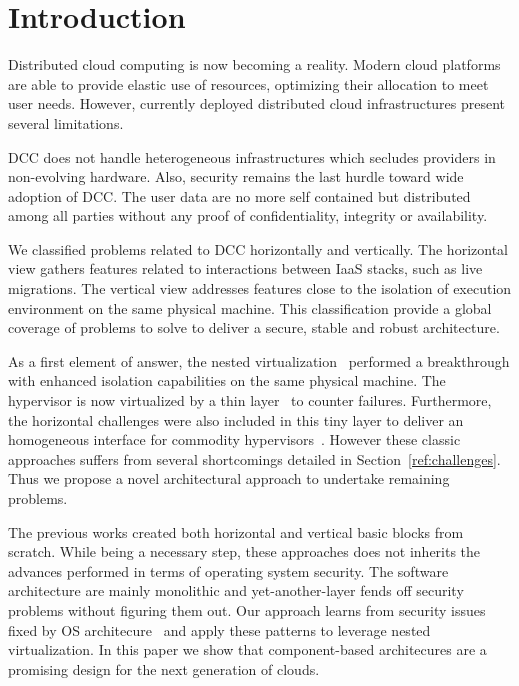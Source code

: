 \documentclass{sig-alternate}
\begin{document}
\section{Introduction}
\label{sec:intro}

\noindent Distributed cloud computing is now becoming a reality. Modern cloud platforms are able to provide elastic use of resources, optimizing their allocation to meet user needs. However, currently deployed distributed cloud infrastructures present several limitations.

DCC does not handle heterogeneous infrastructures which secludes providers in non-evolving hardware.
Also, security remains the last hurdle toward wide adoption of DCC. The user data are no more self contained but distributed among all parties without any proof of confidentiality, integrity or availability.

We classified problems related to DCC horizontally and vertically. The horizontal view gathers features related to interactions between IaaS stacks, such as live migrations. The vertical view addresses features close to the isolation of execution environment on the same physical machine. This classification provide a global coverage of problems to solve to deliver a secure, stable and robust architecture.

As a first element of answer, the nested virtualization~\cite{turtle:ibm} performed a breakthrough with enhanced isolation capabilities on the same physical machine. The hypervisor is now virtualized by a thin layer~\cite{cloudvisor:zhang} to counter failures. Furthermore, the horizontal challenges were also included in this tiny layer to deliver an homogeneous interface for commodity hypervisors~\cite{art:blan, xclo:blank}. However these classic approaches suffers from several shortcomings detailed in Section~\ref{ref:challenges}. Thus we propose a novel architectural approach to undertake remaining problems.

The previous works created both horizontal and vertical basic blocks from scratch. While being a necessary step, these approaches does not inherits the advances performed in terms of operating system security. The software architecture are mainly monolithic and yet-another-layer fends off security problems without
figuring them out. Our approach learns from security issues fixed by OS architecure~\cite{liedtke1995micCon} and apply these patterns to leverage nested virtualization. In this paper we show that component-based architecures are a promising design for the next generation of clouds.
\end{document}
